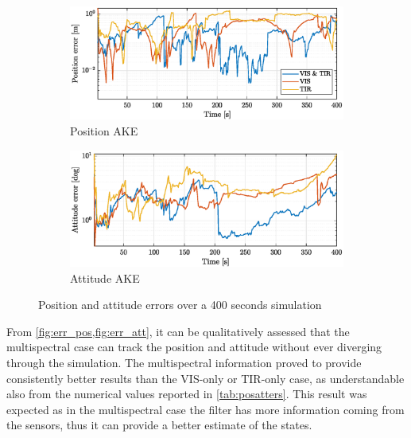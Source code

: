 \begin{figure}[!h]
    \begin{subfigure}[b]{1\textwidth}
    \centering
    \includegraphics[width=0.93\linewidth]{Images/pos_err_corrected.eps}
    \caption{Position AKE}
    \label{fig:err_pos}
    \end{subfigure}\hfill
    \begin{subfigure}[b]{1\textwidth}
    \centering
    \includegraphics[width=0.93\linewidth]{Images/att_err_corrected.eps}
    \caption{Attitude AKE}
    \label{fig:err_att}
    \end{subfigure}
    \caption{Position and attitude errors over a 400 seconds simulation}
    \label{fig:err_posatt}
\end{figure}
From \cref{fig:err_pos,fig:err_att}, it can be qualitatively assessed that the multispectral case can track the position and attitude without ever diverging through the simulation. The multispectral information proved to provide consistently better results than the VIS-only or TIR-only case, as understandable also from the numerical values reported in \cref{tab:posatters}. This result was expected as in the multispectral case the filter has more information coming from the sensors, thus it can provide a better estimate of the states. \newline

